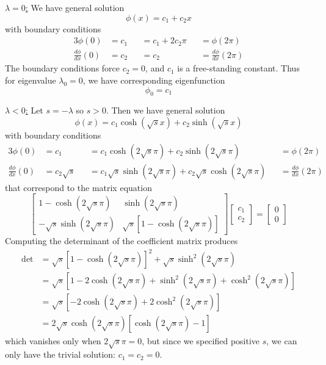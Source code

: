 \documentclass[a4paper]{article}
\begin{document}
\underline{\( \lambda = 0 \):} We have general solution
\[
	\phi \!\left( x \right) = c_{1} + c_{2}x 
\]
with boundary conditions
\begin{alignat*}{3}
	\phi \!\left( 0 \right) & = c_{1} && = c_{1} + 2 c_{2}\pi && = \phi \!\left( 2 \pi \right) \\
	\frac{d \phi}{d x}\!\left( 0 \right) & = c_{2} && = c_{2} && = \frac{d \phi}{d x}\!\left( 2 \pi \right)
\end{alignat*}
The boundary conditions force \( c_{2} = 0 \), and \( c_{1} \) is a free-standing constant. Thus for eigenvalue \( \lambda_{0} = 0 \), we have corresponding eigenfunction
\[
	\phi_{0} = c_{1} 
\]

\underline{\( \lambda < 0 \):} Let \( s = -\lambda \) so \( s > 0 \). Then we have general solution
\[
	\phi \!\left( x \right) = c_{1}\cosh\!\left(\sqrt{s}x\right) + c_{2}\sinh\!\left(\sqrt{s}x\right) 
\]
with boundary conditions
\begin{alignat*}{3}
	\phi \!\left( 0 \right) & = c_{1} && = c_{1}\cosh\!\left(2 \sqrt{s}\pi \right) + c_{2}\sinh\!\left(2 \sqrt{s}\pi \right) && = \phi \!\left( 2 \pi \right) \\
	\frac{d \phi}{d x}\!\left( 0 \right) & = c_{2}\sqrt{s} && = c_{1}\sqrt{s}\sinh\!\left(2 \sqrt{s}\pi \right) + c_{2}\sqrt{s}\cosh\!\left(2 \sqrt{s}\pi \right) && = \frac{d \phi}{d x}\!\left( 2 \pi \right)
\end{alignat*}
that correspond to the matrix equation
\[
	\begin{bmatrix}
		1 - \cosh\!\left(2 \sqrt{s}\pi \right) & \sinh\!\left(2 \sqrt{s}\pi \right) \\
		-\sqrt{s}\sinh\!\left(2 \sqrt{s}\pi \right) & \sqrt{s}\!\left[ 1 - \cosh\!\left(2 \sqrt{s}\pi \right) \right]
	\end{bmatrix}
	\begin{bmatrix}
		c_{1} \\
		c_{2}
	\end{bmatrix}
	=
	\begin{bmatrix}
		0 \\
		0
	\end{bmatrix}
\]
Computing the determinant of the coefficient matrix produces
\begin{align*}
	\det & = \sqrt{s}\!\left[ 1 - \cosh\!\left(2 \sqrt{s}\pi \right) \right]^{2} + \sqrt{s}\sinh^{2}\!\left(2 \sqrt{s}\pi \right) \\
	     & = \sqrt{s}\!\left[ 1 - 2 \cosh\!\left(2 \sqrt{s}\pi \right) + \sinh^{2}\!\left(2 \sqrt{s}\pi \right) + \cosh^{2}\!\left(2 \sqrt{s}\pi \right) \right] \\
	     & = \sqrt{s}\!\left[ - 2 \cosh\!\left(2 \sqrt{s}\pi \right) + 2\cosh^{2}\!\left(2 \sqrt{s}\pi \right) \right] \\
	     & = 2 \sqrt{s}\cosh\!\left(2 \sqrt{s}\pi \right)\!\left[ \cosh\!\left(2 \sqrt{s}\pi \right) - 1 \right]
\end{align*}
which vanishes only when \( 2 \sqrt{s}\pi = 0 \), but since we specified positive \( s \), we can only have the trivial solution: \( c_{1} = c_{2} = 0 \).
\end{document}
